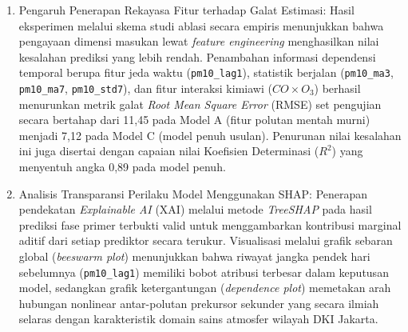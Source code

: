 \begin{enumerate}
    Penarikan kesimpulan terhadap keandalan performa arsitektur hibrida sekuensial ini dibuktikan melalui perbandingan kuantitatif yang jelas terhadap model tunggal murni (\textit{baseline}). Integrasi koreksi residual ini {berhasil memberikan angka keberhasilan peningkatan performa berupa reduksi galat yang signifikan sebesar 22,69\% pada metrik \textit{Root Mean Square Error} (RMSE) dan 22,63\% pada metrik \textit{Mean Absolute Error} (MAE)} jika dibandingkan dengan model \textit{Pure Random Forest} tunggal (RMSE 9,21; MAE 6,85). Kenaikan ini juga diikuti oleh penambahan nilai Koefisien Determinasi ($R^2$) sebesar 0,10 secara absolut. Capaian efisiensi penyesuaian model ini terbukti sangat kuat karena berhasil melampaui batas threshold acuan minimal reduksi galat pada khazanah literatur model hibrida global sejenis yang umumnya hanya berada di rentang 8\% hingga 18\%.

    \item {Pengaruh Penerapan Rekayasa Fitur terhadap Galat Estimasi:} Hasil eksperimen melalui skema studi ablasi secara empiris menunjukkan bahwa pengayaan dimensi masukan lewat \textit{feature engineering} menghasilkan nilai kesalahan prediksi yang lebih rendah. Penambahan informasi dependensi temporal berupa fitur jeda waktu (\texttt{pm10\_lag1}), statistik berjalan (\texttt{pm10\_ma3}, \texttt{pm10\_ma7}, \texttt{pm10\_std7}), dan fitur interaksi kimiawi ($CO \times O_3$) berhasil menurunkan metrik galat \textit{Root Mean Square Error} (RMSE) set pengujian secara bertahap dari 11,45 pada Model A (fitur polutan mentah murni) menjadi 7,12 pada Model C (model penuh usulan). Penurunan nilai kesalahan ini juga disertai dengan capaian nilai Koefisien Determinasi ($R^2$) yang menyentuh angka 0,89 pada model penuh.
    
    \item {Analisis Transparansi Perilaku Model Menggunakan SHAP:} Penerapan pendekatan \textit{Explainable AI} (XAI) melalui metode \textit{TreeSHAP} pada hasil prediksi fase primer terbukti valid untuk menggambarkan kontribusi marginal aditif dari setiap prediktor secara terukur. Visualisasi melalui grafik sebaran global (\textit{beeswarm plot}) menunjukkan bahwa riwayat jangka pendek hari sebelumnya (\texttt{pm10\_lag1}) memiliki bobot atribusi terbesar dalam keputusan model, sedangkan grafik ketergantungan (\textit{dependence plot}) memetakan arah hubungan nonlinear antar-polutan prekursor sekunder yang secara ilmiah selaras dengan karakteristik domain sains atmosfer wilayah DKI Jakarta.
\end{enumerate}

